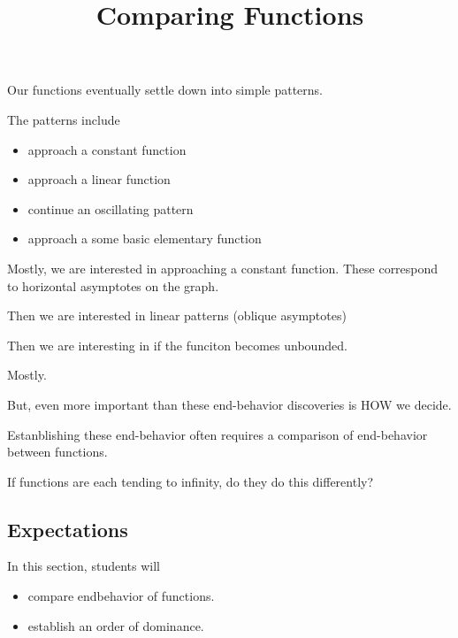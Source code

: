\documentclass{ximera}
\title{Comparing Functions}
\begin{document}
\begin{abstract}
\end{abstract}
\maketitle







Our functions eventually settle down into simple patterns.  

The patterns include

\begin{itemize}
\item approach a constant function
\item approach a linear function
\item continue an oscillating pattern
\item approach a some basic elementary function 
\end{itemize}


Mostly, we are interested in approaching a constant function.  These correspond to horizontal asymptotes on the graph.

Then we are interested in linear patterns (oblique asymptotes)

Then we are interesting in if the funciton becomes unbounded.

Mostly.


But, even more important than these end-behavior discoveries is HOW we decide.

Estanblishing these end-behavior often requires a comparison of end-behavior between functions.  


If functions are each tending to infinity, do they do this differently?


















\subsection{Expectations}


\begin{sectionOutcomes}
In this section, students will 

\begin{itemize}
\item compare endbehavior of functions.
\item establish an order of dominance.
\end{itemize}
\end{sectionOutcomes}
\end{document}
